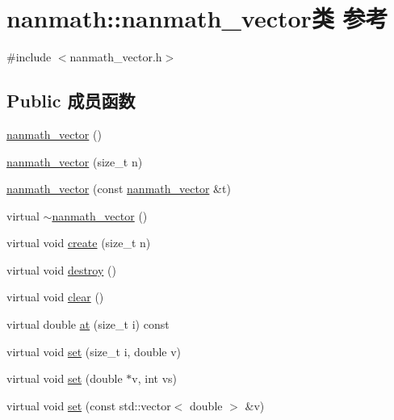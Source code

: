 \hypertarget{classnanmath_1_1nanmath__vector}{}\section{nanmath\+:\+:nanmath\+\_\+vector类 参考}
\label{classnanmath_1_1nanmath__vector}


{\ttfamily \#include $<$nanmath\+\_\+vector.\+h$>$}

\subsection*{Public 成员函数}
\begin{DoxyCompactItemize}
\item 
\hyperlink{classnanmath_1_1nanmath__vector_ac28098c53c4291ce037e15365cfd4b88}{nanmath\+\_\+vector} ()
\item 
\hyperlink{classnanmath_1_1nanmath__vector_a0e16319c50b56097e62694c9f83c5494}{nanmath\+\_\+vector} (size\+\_\+t n)
\item 
\hyperlink{classnanmath_1_1nanmath__vector_afe5d072dfe2201c0fd576fbbb6d1a6d3}{nanmath\+\_\+vector} (const \hyperlink{classnanmath_1_1nanmath__vector}{nanmath\+\_\+vector} \&t)
\item 
virtual \hyperlink{classnanmath_1_1nanmath__vector_abda71a8b607d76e947db2b6f60274e83}{$\sim$nanmath\+\_\+vector} ()
\item 
virtual void \hyperlink{classnanmath_1_1nanmath__vector_af9f7f3a965aee9befe0fff50746848ee}{create} (size\+\_\+t n)
\item 
virtual void \hyperlink{classnanmath_1_1nanmath__vector_a901586a8e1f67af4c1b5c7e5e4126dc0}{destroy} ()
\item 
virtual void \hyperlink{classnanmath_1_1nanmath__vector_a011d39d80690df03197309b2f09105a7}{clear} ()
\item 
virtual double \hyperlink{classnanmath_1_1nanmath__vector_a601939a78266b097d86c2df0ea4504e6}{at} (size\+\_\+t i) const 
\item 
virtual void \hyperlink{classnanmath_1_1nanmath__vector_aa56db6b2a630c59c94b473c459ff4673}{set} (size\+\_\+t i, double v)
\item 
virtual void \hyperlink{classnanmath_1_1nanmath__vector_a331951ae2306cffd3954ccfc2709e68e}{set} (double $\ast$v, int vs)
\item 
virtual void \hyperlink{classnanmath_1_1nanmath__vector_afe89666a38d7fa8182c517ae91639253}{set} (const std\+::vector$<$ double $>$ \&v)

\end{DoxyCompactItemize}
